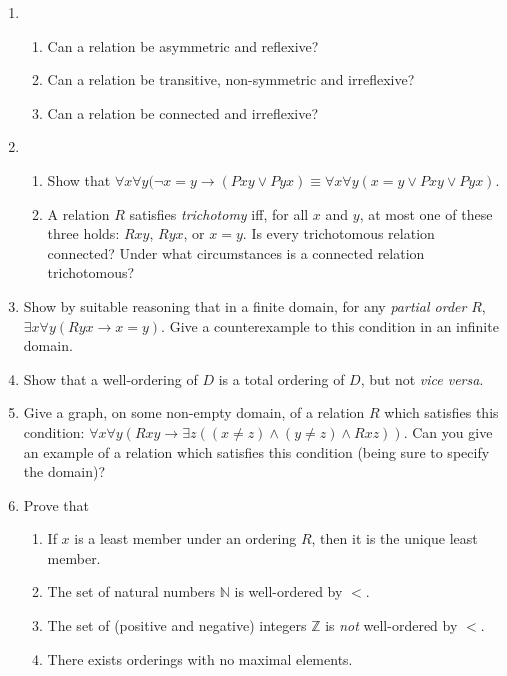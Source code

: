 {\begin{enumerate}
\begin{quote}
\end{quote} (After \citealt[p.\ 52]{pmwmatmel}.)
\item \begin{enumerate}
	\item Can a relation be asymmetric and reflexive?
	\item Can a relation 
	    be transitive, non-symmetric and irreflexive?
	\item 	Can a relation 
		    be connected and irreflexive?
\end{enumerate}  
\item \begin{enumerate}
	\item Show that $\forall x \forall y (\neg x=y\to (Pxy \vee Pyx) \equiv \forall x \forall y (x=y \vee Pxy \vee Pyx)$. 
	\item A relation $R$ satisfies \emph{trichotomy} iff, for all $x$ and $y$, at most one of these three holds: $Rxy$, $Ryx$, or $x=y$. Is every trichotomous relation connected? Under what circumstances is a connected relation trichotomous?
\end{enumerate} 
\item
 Show by suitable reasoning that
    in a finite domain, for any \emph{partial order} $R$,  $\exists x \forall y (Ryx \to
    x=y)$. Give a counterexample to this condition in an infinite domain. 

\item Show that a well-ordering of $D$ is a total ordering
    of $D$, but not \emph{vice versa}.
\item Give a graph, on some non-empty domain, of a relation $R$
	which satisfies this condition:
	$\forall x \forall y (Rxy \to \exists z ((x \neq z) \wedge (y \neq
	z) \wedge Rxz))$. Can you give an example of a relation which
	satisfies this condition (being sure to specify the domain)?
	
	



\item Prove that \begin{enumerate}
	\item If $x$ is a least member under an ordering $R$, then it is the unique least member.
	\item The set of natural numbers $\mathbb{N}$ is well-ordered by $<$.
	\item The set of (positive and negative) integers $\mathbb{Z}$ is \emph{not} well-ordered by $<$.
	\item There exists orderings with no maximal elements.
\end{enumerate}


\end{enumerate}}
